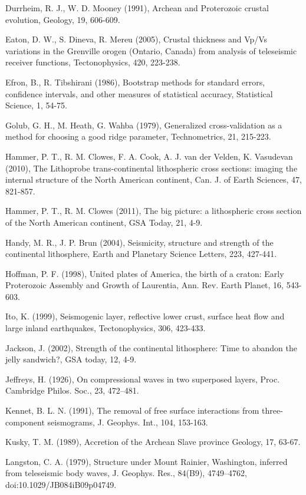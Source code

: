 \documentclass[review]{elsarticle}
\begin{document}
Durrheim, R. J., W. D. Mooney (1991), Archean and Proterozoic crustal evolution, Geology, 19, 606-609.

Eaton, D. W., S. Dineva, R. Mereu (2005), Crustal thickness and Vp/Vs variations in the Grenville orogen (Ontario, Canada) from analysis of teleseismic receiver functions, Tectonophysics, 420, 223-238.

Efron, B., R. Tibshirani (1986), Bootstrap methods for standard errors, confidence intervals, and other measures of statistical accuracy, Statistical Science, 1, 54-75.

Golub, G. H., M. Heath, G. Wahba (1979), Generalized cross-validation as a method for choosing a good ridge parameter, Technometrics, 21, 215-223.

Hammer, P. T., R. M. Clowes, F. A. Cook, A. J. van der Velden, K. Vasudevan (2010), The Lithoprobe trans-continental lithospheric cross sections: imaging the internal structure of the North American continent, Can. J. of Earth Sciences, 47, 821-857.

Hammer, P. T., R. M. Clowes (2011), The big picture: a lithospheric cross section of the North American continent, GSA Today, 21, 4-9.

Handy, M. R.,  J. P. Brun (2004), Seismicity, structure and strength of the continental lithosphere, Earth and Planetary Science Letters, 223, 427-441.

Hoffman, P. F. (1998), United plates of America, the birth of a craton: Early Proterozoic Assembly and Growth of Laurentia, Ann. Rev. Earth Planet, 16, 543-603.

Ito, K. (1999), Seismogenic layer, reflective lower crust, surface heat flow and large inland earthquakes, Tectonophysics, 306, 423-433.

Jackson, J. (2002), Strength of the continental lithosphere: Time to abandon the jelly sandwich?, GSA today, 12, 4-9.

Jeffreys, H. (1926), On compressional waves in two superposed layers, Proc. Cambridge Philos. Soc., 23, 472–481.

Kennet, B. L. N. (1991), The removal of free surface interactions from three-component seismograms, J. Geophys. Int., 104, 153-163.

Kusky, T. M. (1989), Accretion of the Archean Slave province Geology, 17, 63-67.

Langston, C. A. (1979), Structure under Mount Rainier, Washington, inferred from teleseismic body waves, J. Geophys. Res., 84(B9), 4749–4762, doi:10.1029/JB084iB09p04749.
\end{document}
